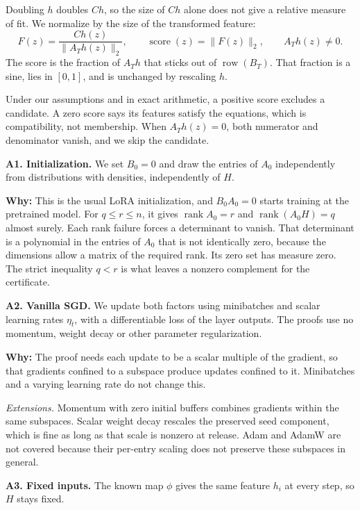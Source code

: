 \documentclass[11pt,a4paper]{article}
\newcommand{\block}[1]{\par\vspace{5pt}{\color{ink}\bfseries #1}\par\vspace{2pt}}
\newcommand{\rank}{\operatorname{rank}}
\newcommand{\row}{\operatorname{row}}
\begin{document}
Doubling \(h\) doubles \(Ch\), so the
size of \(Ch\) alone does not give a relative measure of fit. We normalize
by the size of the transformed feature:
\[
F(z)=\frac{Ch(z)}{\|A_Th(z)\|_2},\qquad
\operatorname{score}(z)=\|F(z)\|_2,\qquad A_Th(z)\ne0.
\]
The score is the fraction of \(A_Th\) that sticks out of \(\row(B_T)\).
That fraction is a sine, lies in \([0,1]\), and is unchanged by rescaling \(h\).

Under our assumptions and in exact arithmetic, a positive score excludes a
candidate. A zero score says its features satisfy the equations, which is
compatibility, not membership. When \(A_Th(z)=0\), both numerator and denominator
vanish, and we skip the candidate.

\block{3. What we assume, and why}
\textbf{A1. Initialization.} We set \(B_0=0\) and draw the entries of \(A_0\)
independently from distributions with densities, independently of \(H\).

\textbf{Why:} This is the usual LoRA initialization, and \(B_0A_0=0\) starts
training at the pretrained model. For \(q\le r\le n\), it gives \(\rank A_0=r\)
and \(\rank(A_0H)=q\) almost surely. Each rank failure forces a determinant to
vanish. That determinant is a polynomial in the entries of \(A_0\) that is not
identically zero, because the dimensions allow a matrix of the required rank.
Its zero set has measure zero. The strict inequality \(q<r\) is what leaves
a nonzero complement for the certificate.

\newpage
\textbf{A2. Vanilla SGD.} We update both factors using minibatches and scalar
learning rates \(\eta_t\), with a differentiable loss of the layer outputs.
The proofs use no momentum, weight decay or other parameter regularization.

\textbf{Why:} The proof needs each update to be a scalar multiple of the
gradient, so that gradients confined to a subspace produce updates confined to it.
Minibatches and a varying learning rate do not change this.

\textit{Extensions.} Momentum with zero initial buffers combines gradients
within the same subspaces. Scalar weight decay rescales the preserved seed
component, which is fine as long as that scale is nonzero at release.
Adam and AdamW are not covered because their per-entry scaling does not
preserve these subspaces in general.

\textbf{A3. Fixed inputs.} The known map \(\phi\) gives the same feature \(h_i\)
at every step, so \(H\) stays fixed.
\end{document}
